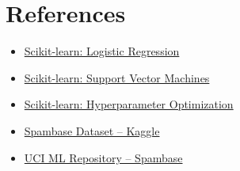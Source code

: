 \documentclass[11pt]{article}
\begin{document}
\section*{References}
\begin{itemize}
\item \href{https://scikit-learn.org/stable/modules/linear_model.html#logistic-regression}{Scikit-learn: Logistic Regression}
\item \href{https://scikit-learn.org/stable/modules/svm.html}{Scikit-learn: Support Vector Machines}
\item \href{https://scikit-learn.org/stable/modules/grid_search.html}{Scikit-learn: Hyperparameter Optimization}
\item \href{https://www.kaggle.com/datasets/somesh24/spambase}{Spambase Dataset – Kaggle}
\item \href{https://archive.ics.uci.edu/ml/datasets/spambase}{UCI ML Repository – Spambase}
\end{itemize}
\end{document}
